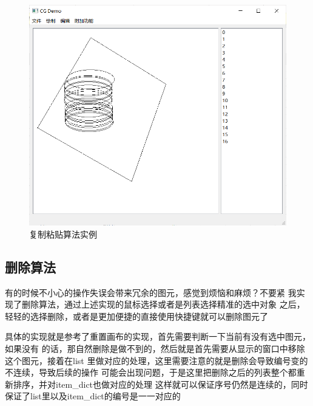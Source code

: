 \documentclass[a4paper,UTF8]{article}
\theoremstyle{definition}
\begin{document}
\begin{figure}[htb]
	\centering
	\includegraphics[scale=0.4]{figure/copypaste.png}
	\caption{复制粘贴算法实例}
	\label{fig:copypaste}
\end{figure}



\subsection{删除算法}
有的时候不小心的操作失误会带来冗余的图元，感觉到烦恼和麻烦？不要紧
我实现了删除算法，通过上述实现的鼠标选择或者是列表选择精准的选中对象
之后，轻轻的选择删除，或者是更加便捷的直接使用快捷键就可以删除图元了

具体的实现就是参考了重置画布的实现，首先需要判断一下当前有没有选中图元，如果没有
的话，那自然删除是做不到的，然后就是首先需要从显示的窗口中移除这个图元，接着在list
里做对应的处理，这里需要注意的就是删除会导致编号变的不连续，导致后续的操作
可能会出现问题，于是这里把删除之后的列表整个都重新排序，并对item\_dict也做对应的处理
这样就可以保证序号仍然是连续的，同时保证了list里以及item\_dict的编号是一一对应的
\end{document}

